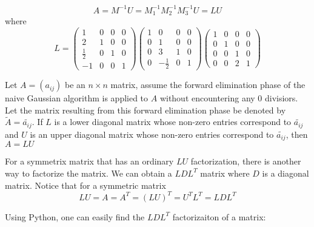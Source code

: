 \begin{example}
  \[
A = M^{-1}U = M_{1}^{-1}M_{2}^{-1}M_{3}^{-1}U = LU
\]
  where
  \[
L =
  \begin{pmatrix}
    1 & 0 & 0 & 0\\
    2 & 1 & 0 & 0\\
    \frac{1}{2} & 0 & 1 & 0\\
    -1 & 0 & 0 & 1
  \end{pmatrix}
  \begin{pmatrix}
    1 & 0 & 0 & 0\\
    0 & 1 & 0 & 0\\
    0 & 3 & 1 & 0\\
    0 & -\frac{1}{2} & 0 & 1
  \end{pmatrix}
  \begin{pmatrix}
    1 & 0 & 0 & 0\\
    0 & 1 & 0 & 0\\
    0 & 0 & 1 & 0\\
    0 & 0 & 2 & 1
  \end{pmatrix}
  \]
\end{example}

\begin{theorem}
  Let \(A = (a_{ij})\) be an \(n \times n\) matrix, assume the forward elimination phase of the naive Gaussian algorithm is applied to \(A\) without encountering any 0 divisiors. Let the matrix resulting from this forward elimination phase be denoted by \(\tilde{A} = \tilde{a_{ij}}\). If \(L\) is a lower diagonal matrix whose non-zero entries correspond to \(\tilde{a_{ij}}\) and \(U\) is an upper diagonal matrix whose non-zero entries correspond to \(\tilde{a_{ij}}\), then \(A = LU\)
\end{theorem}

For a symmetrix matrix that has an ordinary \(LU\) factorization, there is another way to factorize the matrix. We can obtain a \(LDL^{T}\) matrix where \(D\) is a diagonal matrix. Notice that for a symmetric matrix
\[
LU = A = A^{T} = (LU)^{T} = U^{T}L^{T} = LDL^{T}
\]

Using Python, one can easily find the \(LDL^{T}\) factorizaiton of a matrix:

\inputminted[frame = lines, bgcolor = lightgray, linenos]{python}{PythonSources/ldlt.py}

